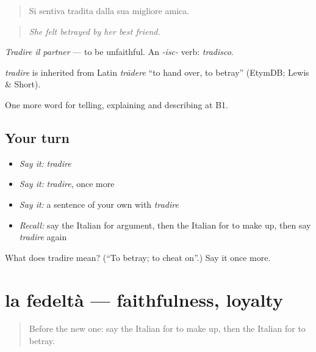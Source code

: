 \begin{quote}
Si sentiva tradita dalla sua migliore amica.
\end{quote}

\begin{quote}
\emph{She felt betrayed by her best friend.}
\end{quote}

\emph{Tradire il partner} — to be unfaithful. An \emph{-isc-} verb: \emph{tradisco}.

\begin{cousinweb}
\emph{tradire} is inherited from Latin \emph{trādere} \textquotedblleft{}to hand over, to betray\textquotedblright{} (EtymDB; Lewis \& Short).
\end{cousinweb}

\begin{grammarlens}[title={What you've built}]
One more word for telling, explaining and describing at B1.
\end{grammarlens}

\subsection*{Your turn}
\begin{itemize}
\raggedright
  \item \emph{Say it:} \emph{tradire}
  \item \emph{Say it:} \emph{tradire}, once more
  \item \emph{Say it:} a sentence of your own with \emph{tradire}
  \item \emph{Recall:} say the Italian for argument, then the Italian for to make up, then say \emph{tradire} again
\end{itemize}

\begin{tcolorbox}[breakable,colback=teal!4,colframe=teal!35!black,title={Before you move on}]
What does tradire mean? (\textquotedblleft{}To betray; to cheat on\textquotedblright{}.) Say it once more.
\end{tcolorbox}
\section[la fedeltà]{la fedeltà — faithfulness, loyalty}

\label{lesson:IT-C499-fedelta}



\begin{quote}
Before the new one: say the Italian for to make up, then the Italian for to betray.
\end{quote}

